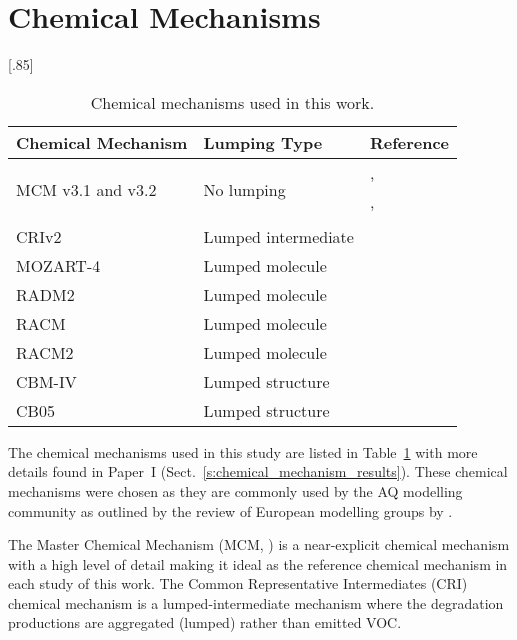 \vspace{-6mm}
\section{Chemical Mechanisms} \label{s:chemical_mechanisms}
\begin{table}[t]%
    \begin{center}%
        \caption{Chemical mechanisms used in this work.}%
        \scalebox{.85}[.85]{\begin{tabular}{lll}%
                \hline \hline
                \textbf{Chemical Mechanism} & \textbf{Lumping Type} & \textbf{Reference} \\
                \hline \hline
                \multirow{3}{*}{MCM v3.1 and v3.2} & \multirow{3}{*}{No lumping} & \citet{Jenkin:1997}, \citet{Jenkin:2003} \\
                & & \citet{Saunders:2003}, \citet{Bloss:2005} \\
                & & \citet{MCM_Site} \\
                CRIv2 & Lumped intermediate & \citet{Jenkin:2008} \\
                MOZART-4 & Lumped molecule & \citet{Emmons:2010} \\
                RADM2 & Lumped molecule & \citet{Stockwell:1990} \\
                RACM & Lumped molecule & \citet{Stockwell:1997} \\
                RACM2 & Lumped molecule & \citet{Goliff:2013} \\
                CBM-IV & Lumped structure & \citet{Gery:1989} \\
                CB05 & Lumped structure & \citet{Yarwood:2005} \\
                \hline \hline
            \end{tabular}%
        }%
        \label{t:mechanisms}%
    \end{center}%
\end{table}%
The chemical mechanisms used in this study are listed in Table~\ref{t:mechanisms} with more details found in Paper~I (Sect.~\ref{s:chemical_mechanism_results}).
These chemical mechanisms were chosen as they are commonly used by the AQ modelling community as outlined by the review of European modelling groups by \citet{Baklanov:2014}.

The Master Chemical Mechanism (MCM, \citet{Jenkin:1997, Jenkin:2003, Saunders:2003, Bloss:2005, MCM_Site}) is a near-explicit chemical mechanism with a high level of detail making it ideal as the reference chemical mechanism in each study of this work.
The Common Representative Intermediates (CRI) chemical mechanism \citep{Jenkin:2008} is a lumped-intermediate mechanism where the degradation productions are aggregated (lumped) rather than emitted VOC.

